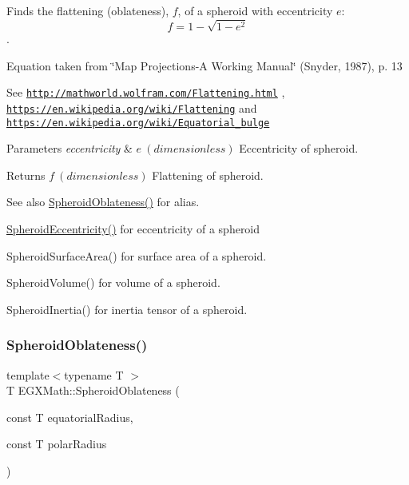 Finds the flattening (oblateness), $f$, of a spheroid with eccentricity $e$\+: \[ f = 1 - \sqrt{1-e^2} \]. 

Equation taken from \char`\"{}\+Map Projections-\/\+A Working Manual\char`\"{} (Snyder, 1987), p. 13

See \href{http://mathworld.wolfram.com/Flattening.html}{\tt http\+://mathworld.\+wolfram.\+com/\+Flattening.\+html} , \href{https://en.wikipedia.org/wiki/Flattening}{\tt https\+://en.\+wikipedia.\+org/wiki/\+Flattening} and \href{https://en.wikipedia.org/wiki/Equatorial_bulge}{\tt https\+://en.\+wikipedia.\+org/wiki/\+Equatorial\+\_\+bulge} 
\begin{DoxyParams}{Parameters}
{\em eccentricity} & $ e\ (dimensionless)$ Eccentricity of spheroid. \\
\hline
\end{DoxyParams}
\begin{DoxyReturn}{Returns}
$ f\ (dimensionless)$ Flattening of spheroid. 
\end{DoxyReturn}
\begin{DoxySeeAlso}{See also}
\mbox{\hyperlink{group___e_g_x_math-_geometry-3_d-_spheroid-_flattening_ga486adfc58b047197daf87f50b2039ca7}{Spheroid\+Oblateness()}} for alias. 

\mbox{\hyperlink{group___e_g_x_math-_geometry-3_d-_spheroid-_eccentricity_gab45680528a41bb7a5e15ddc0059156dd}{Spheroid\+Eccentricity()}} for eccentricity of a spheroid 

Spheroid\+Surface\+Area() for surface area of a spheroid. 

Spheroid\+Volume() for volume of a spheroid. 

Spheroid\+Inertia() for inertia tensor of a spheroid. 
\end{DoxySeeAlso}
\mbox{\label{group___e_g_x_math-_geometry-3_d-_spheroid-_flattening_ga8f547f5dd10721862b602c7769eb6116}} 
\subsubsection{\texorpdfstring{Spheroid\+Oblateness()}{SpheroidOblateness()}\hspace{0.1cm}{\footnotesize\ttfamily [1/2]}}
{\footnotesize\ttfamily template$<$typename T $>$ \\
T E\+G\+X\+Math\+::\+Spheroid\+Oblateness (\begin{DoxyParamCaption}\item[{const T}]{equatorial\+Radius,  }\item[{const T}]{polar\+Radius }\end{DoxyParamCaption})}



